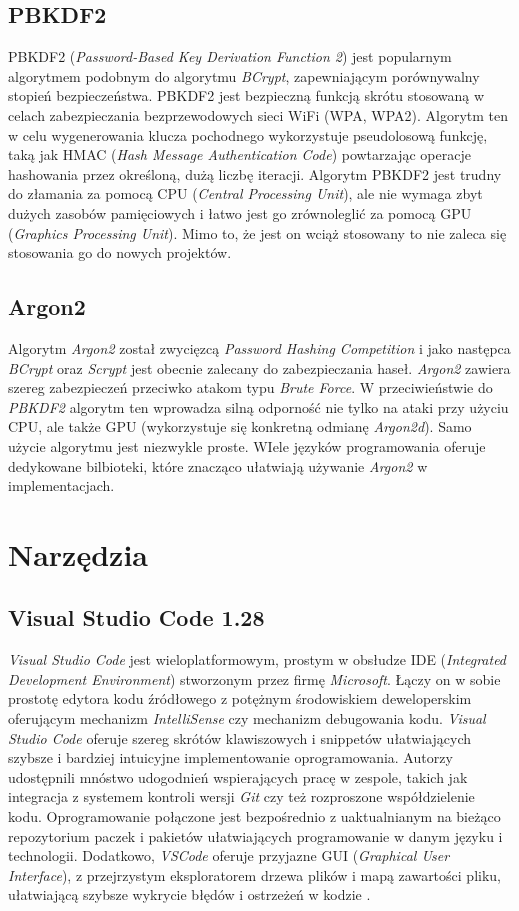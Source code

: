 \subsection{PBKDF2}
PBKDF2 (\textit{Password-Based Key Derivation Function 2}) jest popularnym algorytmem podobnym do algorytmu \textit{BCrypt}, zapewniającym porównywalny stopień bezpieczeństwa. PBKDF2 jest bezpieczną funkcją skrótu stosowaną w celach zabezpieczania bezprzewodowych sieci WiFi (WPA, WPA2). Algorytm ten w celu wygenerowania klucza pochodnego wykorzystuje pseudolosową funkcję, taką jak HMAC (\textit{Hash Message Authentication Code}) powtarzając operacje hashowania przez określoną, dużą liczbę iteracji. Algorytm PBKDF2 jest trudny do złamania za pomocą CPU (\textit{Central Processing Unit}), ale nie wymaga zbyt dużych zasobów pamięciowych i łatwo jest go zrównoleglić za pomocą GPU (\textit{Graphics Processing Unit}). Mimo to, że jest on wciąż stosowany to nie zaleca się stosowania go do nowych projektów. 

\subsection{Argon2}
Algorytm \textit{Argon2} został zwycięzcą \textit{Password Hashing Competition} i jako następca \textit{BCrypt} oraz \textit{Scrypt} jest obecnie zalecany do zabezpieczania haseł. \textit{Argon2} zawiera szereg zabezpieczeń przeciwko atakom typu \textit{Brute Force}. W przeciwieństwie do \textit{PBKDF2} algorytm ten wprowadza silną odporność nie tylko na ataki przy użyciu CPU, ale także GPU (wykorzystuje się konkretną odmianę \textit{Argon2d}). Samo użycie algorytmu jest niezwykle proste. WIele języków programowania oferuje dedykowane bilbioteki, które znacząco ułatwiają używanie \textit{Argon2} w implementacjach. 

\section{Narzędzia}
\subsection{Visual Studio Code 1.28}
\textit{Visual Studio Code} jest wieloplatformowym, prostym w obsłudze IDE (\textit{Integrated Development Environment}) stworzonym przez firmę \textit{Microsoft}. Łączy on w sobie prostotę edytora kodu źródłowego z potężnym środowiskiem deweloperskim oferującym mechanizm \textit{IntelliSense} czy mechanizm debugowania kodu. \textit{Visual Studio Code} oferuje szereg skrótów klawiszowych i snippetów ułatwiających szybsze i bardziej intuicyjne implementowanie oprogramowania. Autorzy udostępnili mnóstwo udogodnień wspierających pracę w zespole, takich jak integracja z systemem kontroli wersji \textit{Git} czy też rozproszone współdzielenie kodu. Oprogramowanie połączone jest bezpośrednio z uaktualnianym na bieżąco repozytorium paczek i pakietów ułatwiających programowanie w danym języku i technologii. Dodatkowo, \textit{VSCode} oferuje przyjazne GUI (\textit{Graphical User Interface}), z przejrzystym eksploratorem drzewa plików i mapą zawartości pliku, ułatwiającą szybsze wykrycie błędów i ostrzeżeń w kodzie \cite{Vsc}.

